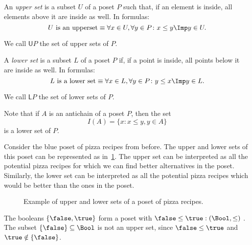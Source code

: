 \begin{definition}
\label{def:upperset}
An \emph{upper set} is a subset $U$ of a poset $P$ such
that, if an element is inside, all elements above it are inside as well.
In formulas:
\begin{equation}
\text{$U$ is an upperset} \equiv \forall x\in U, \forall y\in P\colon x\leq y \Imp y\in U.
\end{equation}
\end{definition}
\begin{remark}
We call $\mathsf{U}P$ the set of upper sets of $P$.
\end{remark}



\begin{definition}
\label{def:lowerset}
A \emph{lower set} is a subset $L$ of a poset $P$ if, if a point is inside, all points below it are inside as well. In formulas:
\begin{equation}
\text{$L$ is a lower set} \equiv \forall x\in L, \forall y\in P\colon y\leq x \Imp y\in L.
\end{equation}
\end{definition}
\begin{remark}
We call $\mathsf{L}P$ the set of lower sets of $P$.
\end{remark}

\begin{remark}
Note that if $A$ is an antichain of a poset $P$, then the set
\begin{equation}
    I(A)=\{x\colon x\leq y, y\in A\}
\end{equation}
is a lower set of $P$.
\end{remark}



Consider the blue poset of pizza recipes from before. The upper and lower sets of this poset can be represented as in~\cref{fig:upperset}. The upper set can be interpreted as all the potential pizza recipes for which we can find better alternatives in the poset. Similarly, the lower set can be interpreted as all the potential pizza recipes which would be better than the ones in the poset.

\begin{figure}[h!]
\begin{center}
\end{center}
\caption{Example of upper and lower sets of a poset of pizza recipes. \label{fig:upperset}}
\end{figure}
\begin{example}
The booleans $\{\false, \true \}$ form a poset with $\false \leq \true:(\Bool,\leq)$ . The subset $\{\false\} \subseteq \Bool$ is not an upper set, since $\false \leq \true$ and $\true \notin \{\false \}$.	
\end{example}

